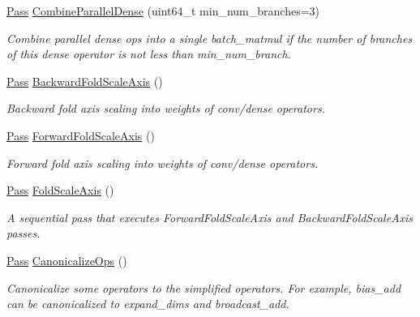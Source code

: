 \begin{DoxyCompactItemize}
\hyperlink{namespacetvm_1_1relay_1_1transform_afa666ade112e9955059095d695238a9a}{Pass} \hyperlink{namespacetvm_1_1relay_1_1transform_a186d1029887d7b33d002798d414f4d31}{Combine\+Parallel\+Dense} (uint64\+\_\+t min\+\_\+num\+\_\+branches=3)
\begin{DoxyCompactList}\small\item\em Combine parallel dense ops into a single batch\+\_\+matmul if the number of branches of this dense operator is not less than {\ttfamily min\+\_\+num\+\_\+branch}. \end{DoxyCompactList}\item 
\hyperlink{namespacetvm_1_1relay_1_1transform_afa666ade112e9955059095d695238a9a}{Pass} \hyperlink{namespacetvm_1_1relay_1_1transform_a3bde64d7774dcda7735f73a4e2ebecf7}{Backward\+Fold\+Scale\+Axis} ()
\begin{DoxyCompactList}\small\item\em Backward fold axis scaling into weights of conv/dense operators. \end{DoxyCompactList}\item 
\hyperlink{namespacetvm_1_1relay_1_1transform_afa666ade112e9955059095d695238a9a}{Pass} \hyperlink{namespacetvm_1_1relay_1_1transform_aab7f62610e05ed0211f17d452ee37f5f}{Forward\+Fold\+Scale\+Axis} ()
\begin{DoxyCompactList}\small\item\em Forward fold axis scaling into weights of conv/dense operators. \end{DoxyCompactList}\item 
\hyperlink{namespacetvm_1_1relay_1_1transform_afa666ade112e9955059095d695238a9a}{Pass} \hyperlink{namespacetvm_1_1relay_1_1transform_a73946a29efe8cf6f186a681296c8e943}{Fold\+Scale\+Axis} ()
\begin{DoxyCompactList}\small\item\em A sequential pass that executes Forward\+Fold\+Scale\+Axis and Backward\+Fold\+Scale\+Axis passes. \end{DoxyCompactList}\item 
\hyperlink{namespacetvm_1_1relay_1_1transform_afa666ade112e9955059095d695238a9a}{Pass} \hyperlink{namespacetvm_1_1relay_1_1transform_adcddf150ca7da40e20408928421b0086}{Canonicalize\+Ops} ()
\begin{DoxyCompactList}\small\item\em Canonicalize some operators to the simplified operators. For example, bias\+\_\+add can be canonicalized to expand\+\_\+dims and broadcast\+\_\+add. \end{DoxyCompactList}\item 

\end{DoxyCompactItemize}

